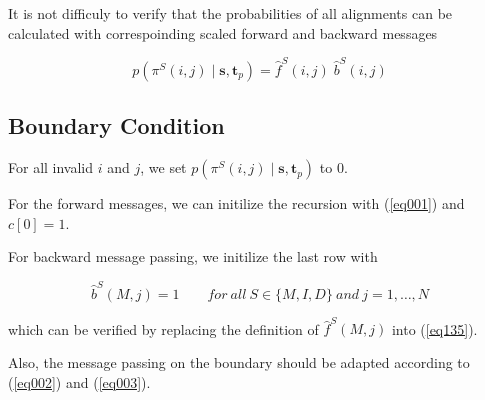 \documentclass[10pt]{article}
\begin{document}
    It is not difficuly to verify that the probabilities of all alignments can be calculated with correspoinding scaled forward and backward messages

    \begin{equation} \label{eq135}
      p\left(\pi^S(i, j) \;|\; \mathbf{s}, \mathbf{t}_p\right) = \widehat{f}^{S}(i, j)\;\widehat{b}^{S}(i, j)
    \end{equation}

    \subsection{Boundary Condition}

    For all invalid $i$ and $j$, we set $p\left(\pi^S(i, j) \;|\; \mathbf{s}, \mathbf{t}_p\right)$ to 0.

    For the forward messages, we can initilize the recursion with (\ref{eq001}) and $c[0] = 1$.
    
    For backward message passing, we initilize the last row with

    \begin{equation}
      \widehat{b}^{S}(M, j) = 1 \qquad for\ all\ S \in \{M, I, D\}\ and\ j=1, \dots, N
    \end{equation}

    which can be verified by replacing the definition of $\widehat{f}^{S}(M, j)$ into (\ref{eq135}).

    Also, the message passing on the boundary should be adapted according to (\ref{eq002}) and (\ref{eq003}).
\end{document}
